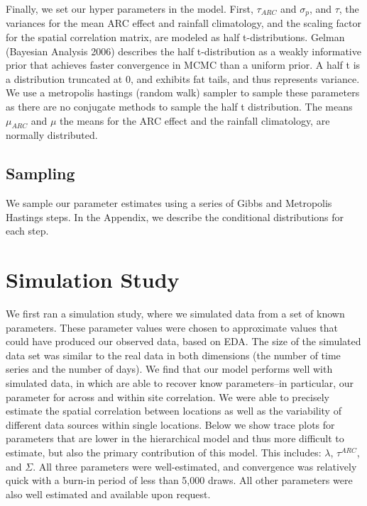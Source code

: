 \documentclass[12pt]{article}
\begin{document}
Finally, we set our hyper parameters in the model. First, $\tau_{ARC}$ and $\sigma_p$, and $\tau$, the variances for the mean ARC effect and rainfall climatology, and the scaling factor for the spatial correlation matrix, are modeled as half t-distributions. Gelman (Bayesian Analysis 2006) describes the half t-distribution as a weakly informative prior that achieves faster convergence in MCMC than a uniform prior. A half t is a distribution truncated at 0, and exhibits fat tails, and thus represents variance. We use a metropolis hastings (random walk) sampler to sample these parameters as there are no conjugate methods to sample the half t distribution. The means $\mu_{ARC}$ and $\mu$ the means for the ARC effect and the rainfall climatology, are normally distributed. 

\subsection{Sampling}
We sample our parameter estimates using a series of Gibbs and Metropolis Hastings steps. In the Appendix, we describe the conditional distributions for each step.


\section{Simulation Study}
\label{sec:sim}
We first ran a simulation study, where we simulated data from a set of known parameters. These parameter values were chosen to approximate values that could have produced our observed data, based on EDA. The size of the simulated data set was similar to the real data in both dimensions (the number of time series and the number of days). We find that our model performs well with simulated data, in which are able to recover know parameters--in particular, our parameter for across and within site correlation. We were able to precisely estimate the spatial correlation between locations as well as the variability of different data sources within single locations. Below we show trace plots for parameters that are lower in the hierarchical model and thus more difficult to estimate, but also the primary contribution of this model. This includes: $\lambda$, $\tau^{ARC}$, and $\Sigma$. All three parameters were well-estimated, and convergence was relatively quick with a burn-in period of less than 5,000 draws. All other parameters were also well estimated and available upon request. 
\end{document}

